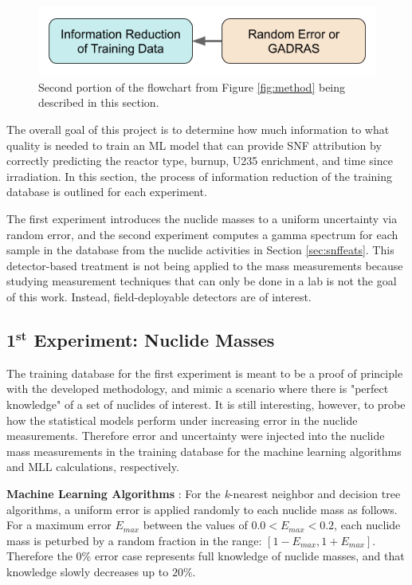 \begin{figure}[H]
  \centering
  \includegraphics[width=0.7\linewidth]{./chapters/method/methodology2.png}
  \caption{Second portion of the flowchart from Figure \ref{fig:method} being 
           described in this section.}
\end{figure}

The overall goal of this project is to determine how much information to what
quality is needed to train an \gls{ML} model that can provide \gls{SNF}
attribution by correctly predicting the reactor type, burnup, \gls{U235}
enrichment, and time since irradiation.  In this section, the process of
information reduction of the training database is outlined for each experiment. 

The first experiment introduces the nuclide masses to a uniform uncertainty via
random error, and the second experiment computes a gamma spectrum for each
sample in the database from the nuclide activities in Section
\ref{sec:snffeats}.  This detector-based treatment is not being applied to the
mass measurements because studying measurement techniques that can only be done
in a lab is not the goal of this work.  Instead, field-deployable detectors are
of interest. 

\subsection{1$^{\mathbf{st}}$ Experiment: Nuclide Masses}
\label{sec:masserr}

The training database for the first experiment is meant to be a proof of
principle with the developed methodology, and mimic a scenario where there is
"perfect knowledge" of a set of nuclides of interest. It is still interesting,
however, to probe how the statistical models perform under increasing error in
the nuclide measurements. Therefore error and uncertainty were injected into
the nuclide mass measurements in the training database for the machine learning
algorithms and \gls{MLL} calculations, respectively. 

\noindent \textbf{Machine Learning Algorithms} : For the \textit{k}-nearest
neighbor and decision tree algorithms, a uniform error is applied randomly to
each nuclide mass as follows.  For a maximum error $E_{max}$ between the values
of $0.0 < E_{max} < 0.2$, each nuclide mass is peturbed by a random fraction in
the range: $[1-E_{max},1+E_{max}]$.  Therefore the $0\%$ error case represents
full knowledge of nuclide masses, and that knowledge slowly decreases up to
$20\%$. 

